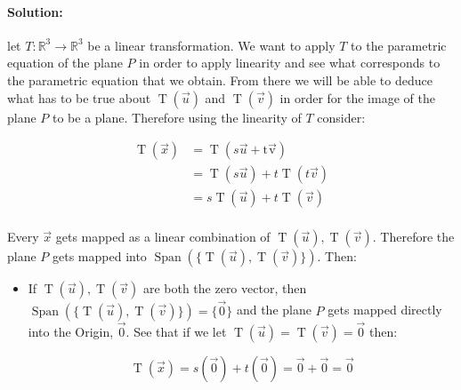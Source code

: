 \documentclass[12pt, letterpaper]{article}
\newcommand{\R}{\mathbb{R}}
\theoremstyle{statement}
\theoremstyle{statement}
\newenvironment{Solution}{\noindent\ignorespaces\paragraph{Solution:}}{\hfill \ding{122}\par\noindent}
\begin{document}
        \begin{Solution}
        let $T: \R^3 \longrightarrow \R^3$ be a linear transformation. We want to apply $T$ to the parametric equation of the plane $P$ in order to apply linearity and see what corresponds to the parametric equation that we obtain. From there we will be able to deduce what has to be true about $\operatorname{T}(\Vec{u})$ and $\operatorname{T}(\Vec{v})$ in order for the image of the plane $P$ to be a plane. Therefore using the linearity of $T$ consider:
        
        \begin{align*}
            \operatorname{T}(\Vec{x}) & = \operatorname{T}(s\Vec{u} + \operatorname{t\Vec{v}})  \\
            & = \operatorname{T}(s\Vec{u}) +
            t\operatorname{T}(t\Vec{v}) \\
            & = s\operatorname{T}(\Vec{u}) + t\operatorname{T}(\Vec{v})  \\ 
        \end{align*}
        
        Every $\Vec{x}$ gets mapped as a linear combination of $\operatorname{T}(\Vec{u}), \operatorname{T}(\Vec{v})$. Therefore the plane $P$ gets mapped into $\operatorname{Span}( \{ \operatorname{T}(\Vec{u}), \operatorname{T}(\Vec{v})\})$. Then:
        
        \begin{itemize}
            \item If $\operatorname{T}(\Vec{u}), \operatorname{T}(\Vec{v})$ are both the zero vector, then $\operatorname{Span}(\{ \operatorname{T}(\Vec{u}), \operatorname{T}(\Vec{v})\}) = \{ \Vec{0}\}$ and the plane $P$ gets mapped directly into the Origin, $\Vec{0}$. See that if we let $\operatorname{T}(\Vec{u}) = \operatorname{T}(\Vec{v}) = \Vec{0}$ then: 
            
            $$\operatorname{T}(\Vec{x})=s(\Vec{0})+t(\Vec{0})=\Vec{0}+\Vec{0}=\Vec{0}$$
            

\end{itemize}
\end{Solution}
\end{document}
